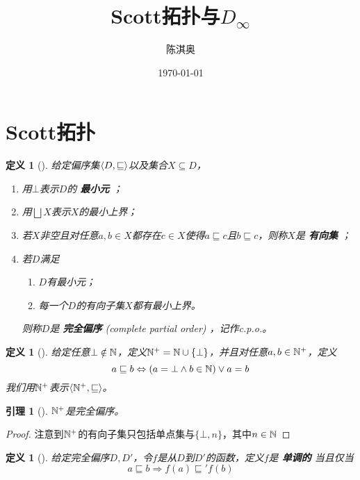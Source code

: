 \documentclass[11pt]{article}
\author{陈淇奥}
\date{\today}
\title{Scott拓扑与\(D_\infty\)}
\newtheorem{lemma}[theorem]{引理}
\newtheorem{definition}[theorem]{定义}
\begin{document}
\maketitle

\section{Scott拓扑}
\label{sec:org4d67d21}

\begin{definition}[]
给定偏序集\(\langle D,\sqsubseteq\rangle\)以及集合\(X\subseteq D\)，
\begin{enumerate}
\item 用\(\bot\)表示\(D\)的 \textbf{最小元} ；
\item 用\(\bigsqcup X\)表示\(X\)的最小上界；
\item 若\(X\)非空且对任意\(a,b\in X\)都存在\(c\in X\)使得\(a\sqsubseteq c\)且\(b\sqsubseteq c\)，则称\(X\)是 \textbf{有向集} ；
\item 若\(D\)满足
\begin{enumerate}
\item \(D\)有最小元；
\item 每一个\(D\)的有向子集\(X\)都有最小上界。
\end{enumerate}
则称\(D\)是 \textbf{完全偏序} (complete partial order) ，记作c.p.o.。
\end{enumerate}
\end{definition}

\begin{definition}[]
给定任意\(\bot\notin\mathbb{N}\)，定义\(\mathbb{N}^+=\mathbb{N}\cup\{\bot\}\)，并且对任意\(a,b\in\mathbb{N}^+\)，定义
\begin{equation*}
a\sqsubseteq b\Leftrightarrow(a=\bot\wedge b\in\mathbb{N})\vee a=b
\end{equation*}
我们用\(\mathbb{N}^+\)表示\(\langle\mathbb{N}^+,\sqsubseteq\rangle\)。
\end{definition}

\begin{lemma}[]
\(\mathbb{N}^+\)是完全偏序。
\end{lemma}

\begin{proof}
注意到\(\mathbb{N}^+\)的有向子集只包括单点集与\(\{\bot,n\}\)，其中\(n\in\mathbb{N}\)
\end{proof}

\begin{definition}[]
给定完全偏序\(D,D'\)，令\(f\)是从\(D\)到\(D'\)的函数，定义\(f\)是 \textbf{单调的} 当且仅当
\begin{equation*}
a\sqsubseteq b\Rightarrow f(a)\sqsubseteq'f(b)
\end{equation*}
\end{definition}
\end{document}
